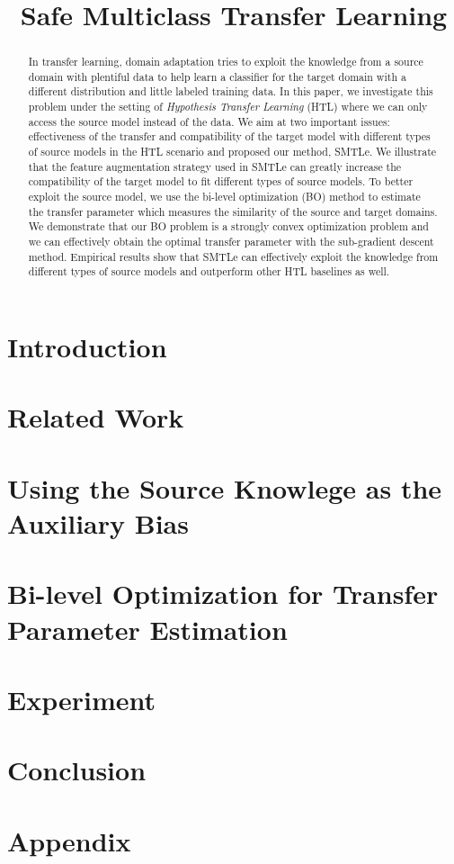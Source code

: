 \documentclass{llncs}
\begin{document}
\title{Safe Multiclass Transfer Learning}
\maketitle
\begin{abstract}
	In transfer learning, domain adaptation tries to exploit the knowledge from a source domain with plentiful data to help learn a classifier for the target domain with a different distribution and little labeled training data. 
	In this paper, we investigate this problem under the setting of \textit{Hypothesis Transfer Learning} (HTL) where we can only access the source model instead of the data. We aim at two important issues: effectiveness of the transfer and compatibility of the target model with different types of source models in the HTL scenario and proposed our method, SMTLe.
	We illustrate that the feature augmentation strategy used in SMTLe can greatly increase the compatibility of the target model to fit different types of source models. To better exploit the source model, we use the bi-level optimization (BO) method to estimate the transfer parameter which measures the similarity of the source and target domains. We demonstrate that our BO problem is a strongly convex optimization problem and we can effectively obtain the optimal transfer parameter with the sub-gradient descent method. Empirical results show that SMTLe can effectively exploit the knowledge from different types of source models and outperform other HTL baselines as well.  
\end{abstract}

\section{Introduction}


\section{Related Work}\label{sec:work}


\section{Using the Source Knowlege as the Auxiliary Bias}\label{sec:prob}


\section{Bi-level Optimization for Transfer Parameter Estimation}\label{sec:smitle}


%

\section{Experiment}\label{sec:exp}


\section{Conclusion}



\section*{Appendix}







\end{document}
